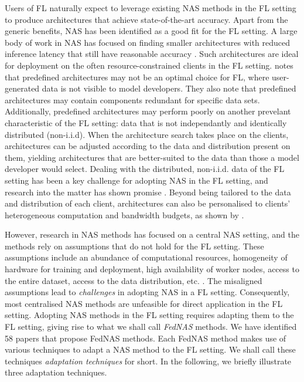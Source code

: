 Users of FL naturally expect to leverage existing NAS methods in the FL setting to produce architectures that achieve state-of-the-art accuracy. Apart from the generic benefits, NAS has been identified as a good fit for the FL setting. A large body of work in NAS has focused on finding smaller architectures with reduced inference latency that still have reasonable accuracy \cite{nas_1000_papers_2023}. Such architectures are ideal for deployment on the often resource-constrained clients in the FL setting. \cite{fl_advances_and_open_problems_2021} notes that predefined architectures may not be an optimal choice for FL, where user-generated data is not visible to model developers. They also note that predefined architectures may contain components redundant for specific data sets. Additionally, predefined architectures may perform poorly on another prevelant characteristic of the FL setting: data that is not independantly and identically distributed (non-i.i.d). When the architecture search takes place on the clients, architectures can be adjusted according to the data and distribution present on them, yielding architectures that are better-suited to the data than those a model developer would select. Dealing with the distributed, non-i.i.d. data of the FL setting has been a key challenge for adopting NAS in the FL setting, and research into the matter has shown promise \cite{fednas_2021} \cite{rl_fednas_2021} \cite{fedoras_2022} \cite{finch_2024} \cite{peaches_2024}. Beyond being tailored to the data and distribution of each client, architectures can also be personalised to clients' heterogeneous computation and bandwidth budgets, as shown by \cite{superfednas_2024} \cite{fedoras_2022} \cite{perfedrlnas_2024} \cite{decnas_2022}. 

However, research in NAS methods has focused on a central NAS setting, and the methods rely on assumptions that do not hold for the FL setting. These assumptions include an abundance of computational resources, homogeneity of hardware for training and deployment, high availability of worker nodes, access to the entire dataset, access to the data distribution, etc. \cite{fl_advances_and_open_problems_2021}. The misaligned assumptions lead to \textit{challenges} in adopting NAS in a FL setting. Consequently, most centralised NAS methods are unfeasible for direct application in the FL setting. Adopting NAS methods in the FL setting requires adapting them to the FL setting, giving rise to what we shall call \textit{FedNAS} methods. We have identified 58 papers that propose FedNAS methods. Each FedNAS method makes use of various techniques to adapt a NAS method to the FL setting. We shall call these techniques \textit{adaptation techniques} for short. In the following, we briefly illustrate three adaptation techniques. 

